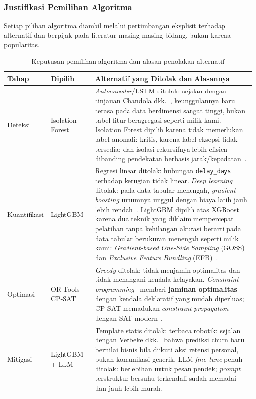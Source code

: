 \documentclass[12pt,a4paper]{article}
\begin{document}
\subsubsection{Justifikasi Pemilihan Algoritma}

Setiap pilihan algoritma diambil melalui pertimbangan eksplisit terhadap alternatif dan berpijak pada literatur masing-masing bidang, bukan karena popularitas.

\begin{table}[H]
  \centering\footnotesize
  \caption{Keputusan pemilihan algoritma dan alasan penolakan alternatif}
  \begin{tabularx}{\textwidth}{L{2.2cm} L{2.5cm} Y}
    \toprule
    \textbf{Tahap} & \textbf{Dipilih} & \textbf{Alternatif yang Ditolak dan Alasannya} \\
    \midrule
    Deteksi
      & Isolation Forest~\cite{iforest,iforesttkdd}
      & \textit{Autoencoder}/LSTM ditolak: sejalan dengan tinjauan Chandola dkk.~\cite{chandola}, keunggulannya baru terasa pada data berdimensi sangat tinggi, bukan tabel fitur beragregasi seperti milik kami. Isolation Forest dipilih karena tidak memerlukan label anomali: kritis, karena label eksepsi tidak tersedia: dan isolasi rekursifnya lebih efisien dibanding pendekatan berbasis jarak/kepadatan~\cite{iforest}. \\[1.5pt]
    Kuantifikasi
      & LightGBM~\cite{lightgbm}
      & Regresi linear ditolak: hubungan \texttt{delay\_days} terhadap kerugian tidak linear. \textit{Deep learning} ditolak: pada data tabular menengah, \textit{gradient boosting} umumnya unggul dengan biaya latih jauh lebih rendah~\cite{lightgbm}. LightGBM dipilih atas XGBoost~\cite{xgboost} karena dua teknik yang diklaim mempercepat pelatihan tanpa kehilangan akurasi berarti pada data tabular berukuran menengah seperti milik kami: \textit{Gradient-based One-Side Sampling} (GOSS) dan \textit{Exclusive Feature Bundling} (EFB)~\cite{lightgbm}. \\[1.5pt]
    Optimasi
      & OR-Tools CP-SAT~\cite{ortools}
      & \textit{Greedy} ditolak: tidak menjamin optimalitas dan tidak menangani kendala kelayakan. \textit{Constraint programming}~\cite{wolsey} memberi \textbf{jaminan optimalitas} dengan kendala deklaratif yang mudah diperluas; CP-SAT memadukan \textit{constraint propagation} dengan SAT modern~\cite{ortools}. \\[1.5pt]
    Mitigasi
      & LightGBM + LLM
      & Template statis ditolak: terbaca robotik: sejalan dengan Verbeke dkk.~\cite{verbeke} bahwa prediksi churn baru bernilai bisnis bila diikuti aksi retensi personal, bukan komunikasi generik. LLM \textit{fine-tune} penuh ditolak: berlebihan untuk pesan pendek; \textit{prompt} terstruktur bersuhu terkendali sudah memadai dan jauh lebih murah. \\
    \bottomrule
  \end{tabularx}
\end{table}
\end{document}
